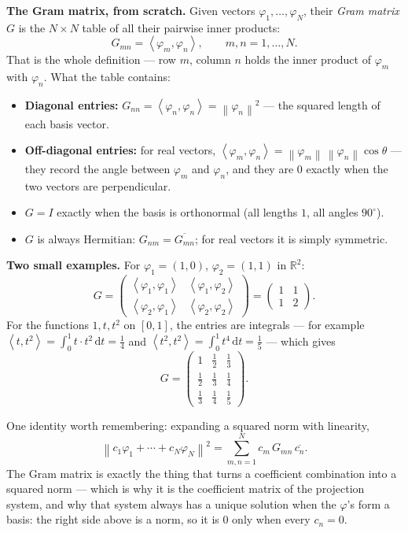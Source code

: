 \documentclass[11pt]{article}
\newcommand{\R}{\mathbb{R}}
\newcommand{\1}{\mathbf{1}}
\newcommand{\dd}{\,\mathrm{d}}
\newcommand{\norm}[1]{\left\lVert#1\right\rVert}
\newcommand{\ip}[2]{\left\langle#1,#2\right\rangle}
\theoremstyle{notestyle}
\theoremstyle{definition}
\begin{document}
\par \textbf{The Gram matrix, from scratch.} Given vectors $\varphi_1, \dots,
\varphi_N$, their \textit{Gram matrix} $G$ is the $N \times N$ table of all their
pairwise inner products:
$$G_{mn} = \ip{\varphi_m}{\varphi_n}, \qquad m, n = 1, \dots, N.$$
That is the whole definition --- row $m$, column $n$ holds the inner product of
$\varphi_m$ with $\varphi_n$. What the table contains:
\begin{itemize}
    \item \textbf{Diagonal entries:} $G_{nn} = \ip{\varphi_n}{\varphi_n} =
    \norm{\varphi_n}^2$ --- the squared length of each basis vector.
    \item \textbf{Off-diagonal entries:} for real vectors,
    $\ip{\varphi_m}{\varphi_n} = \norm{\varphi_m}\, \norm{\varphi_n} \cos\theta$ ---
    they record the angle between $\varphi_m$ and $\varphi_n$, and they are $0$ exactly
    when the two vectors are perpendicular.
    \item $G = I$ exactly when the basis is orthonormal (all lengths $1$, all angles
    $90^{\circ}$).
    \item $G$ is always Hermitian: $G_{nm} = \overline{G_{mn}}$; for real vectors it is
    simply symmetric.
\end{itemize}
\par \textbf{Two small examples.} For $\varphi_1 = (1,0)$, $\varphi_2 = (1,1)$ in
$\R^2$:
$$G = \begin{pmatrix} \ip{\varphi_1}{\varphi_1} & \ip{\varphi_1}{\varphi_2} \\
\ip{\varphi_2}{\varphi_1} & \ip{\varphi_2}{\varphi_2} \end{pmatrix}
= \begin{pmatrix} 1 & 1 \\ 1 & 2 \end{pmatrix}.$$
For the functions $1, t, t^2$ on $[0,1]$, the entries are integrals --- for example
$\ip{t}{t^2} = \int_0^1 t \cdot t^2 \dd t = \frac{1}{4}$ and
$\ip{t^2}{t^2} = \int_0^1 t^4 \dd t = \frac{1}{5}$ --- which gives
$$G = \begin{pmatrix}
1 & \tfrac{1}{2} & \tfrac{1}{3} \\
\tfrac{1}{2} & \tfrac{1}{3} & \tfrac{1}{4} \\
\tfrac{1}{3} & \tfrac{1}{4} & \tfrac{1}{5}
\end{pmatrix}.$$
\par One identity worth remembering: expanding a squared norm with linearity,
$$\norm{c_1\varphi_1 + \cdots + c_N\varphi_N}^2
= \sum_{m,n=1}^{N} c_m\, G_{mn}\, \overline{c_n}.$$
The Gram matrix is exactly the thing that turns a coefficient combination into a
squared norm --- which is why it is the coefficient matrix of the projection system,
and why that system always has a unique solution when the $\varphi$'s form a basis:
the right side above is a norm, so it is $0$ only when every $c_n = 0$.
\end{document}
